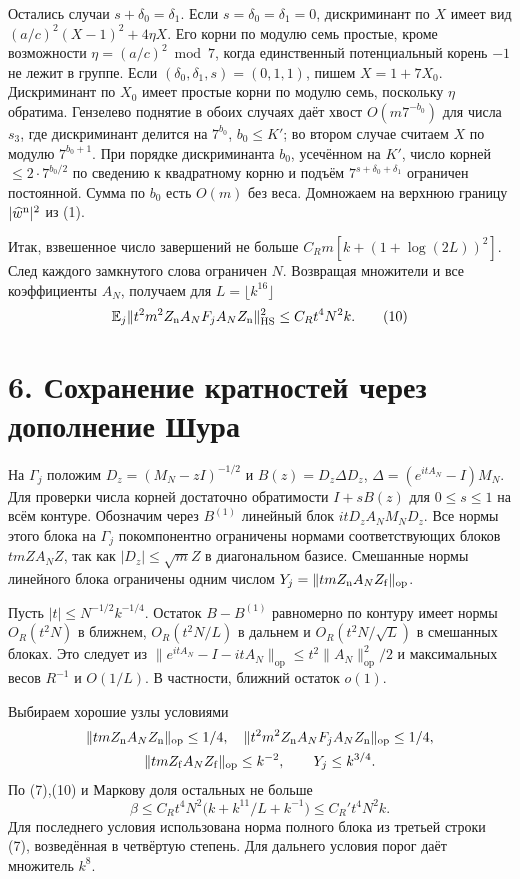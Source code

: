 \documentclass[11pt,a4paper]{article}
\newcommand{\EE}{\mathbb E}
\newcommand{\sect}[1]{\section*{\sffamily\color{ink}#1}}
\newcommand{\op}{\mathrm{op}}
\newcommand{\HS}{\mathrm{HS}}
\begin{document}
Остались случаи \(s+\delta_0=\delta_1\). Если \(s=\delta_0=\delta_1=0\), дискриминант по \(X\) имеет вид \((a/c)^2(X-1)^2+4\eta X\). Его корни по модулю семь простые, кроме возможности \(\eta=(a/c)^2\bmod7\), когда единственный потенциальный корень \(-1\) не лежит в группе. Если \((\delta_0,\delta_1,s)=(0,1,1)\), пишем \(X=1+7X_0\). Дискриминант по \(X_0\) имеет простые корни по модулю семь, поскольку \(\eta\) обратима. Гензелево поднятие в обоих случаях даёт хвост \(O(m7^{-b_0})\) для числа \(s_3\), где дискриминант делится на \(7^{b_0}\), \(b_0\le K'\); во втором случае считаем \(X\) по модулю \(7^{b_0+1}\). При порядке дискриминанта \(b_0\), усечённом на \(K'\), число корней \(\le 2\cdot7^{b_0/2}\) по сведению к квадратному корню и подъём \(7^{s+\delta_0+\delta_1}\) ограничен постоянной. Сумма по \(b_0\) есть \(O(m)\) без веса. Домножаем на верхнюю границу \(|\widehat w^{\rm n}|^2\) из (1).

Итак, взвешенное число завершений не больше \(C_R m[k+(1+\log(2L))^2]\). След каждого замкнутого слова ограничен \(N\). Возвращая множители и все коэффициенты \(A_N\), получаем для \(L=\lfloor k^{16}\rfloor\)
\begin{equation}
 \EE_j\|t^2m^2 Z_{\rm n} A_N F_j A_N Z_{\rm n}\|_{\HS}^2
                           \le C_R t^4 N^2 k.                  \tag{10}
\end{equation}
\newpage
\sect{6. Сохранение кратностей через дополнение Шура}
На \(\Gamma_j\) положим \(D_z=(M_N-zI)^{-1/2}\) и
\(B(z)=D_z\Delta D_z\), \(\Delta=(e^{itA_N}-I)M_N\). Для проверки числа корней достаточно обратимости \(I+s B(z)\) для \(0\le s\le1\) на всём контуре. Обозначим через \(B^{(1)}\) линейный блок \(itD_z A_N M_N D_z\). Все нормы этого блока на \(\Gamma_j\) покомпонентно ограничены нормами соответствующих блоков \(tm Z A_N Z\), так как \(|D_z|\le \sqrt m Z\) в диагональном базисе. Смешанные нормы линейного блока ограничены одним числом \(Y_j=\|tmZ_{\rm n}A_N Z_{\rm f}\|_{\op}\).

Пусть \(|t|\le N^{-1/2}k^{-1/4}\). Остаток \(B-B^{(1)}\) равномерно по контуру имеет нормы \(O_R(t^2 N)\) в ближнем, \(O_R(t^2N/L)\) в дальнем и \(O_R(t^2N/\sqrt L)\) в смешанных блоках. Это следует из \(\|e^{itA_N}-I-itA_N\|_{\op}\le t^2\|A_N\|_{\op}^2/2\) и максимальных весов \(R^{-1}\) и \(O(1/L)\). В частности, ближний остаток \(o(1)\).

Выбираем хорошие узлы условиями
\[
 \begin{gathered}
 \|tmZ_{\rm n} A_N Z_{\rm n}\|_{\op}\le1/4,\quad
 \|t^2m^2 Z_{\rm n} A_N F_j A_N Z_{\rm n}\|_{\op}\le1/4,\\
 \|tmZ_{\rm f} A_N Z_{\rm f}\|_{\op}\le k^{-2},
                         \qquad Y_j\le k^{3/4}.
 \end{gathered}
\]
По (7),(10) и Маркову доля остальных не больше
\begin{equation}
     \beta\le C_R t^4 N^2\bigl(k+k^{11}/L+k^{-1}\bigr)
                        \le C_R' t^4 N^2 k .                   \tag{11}
\end{equation}
Для последнего условия использована норма полного блока из третьей строки (7), возведённая в четвёртую степень. Для дальнего условия порог даёт множитель \(k^8\).
\end{document}
